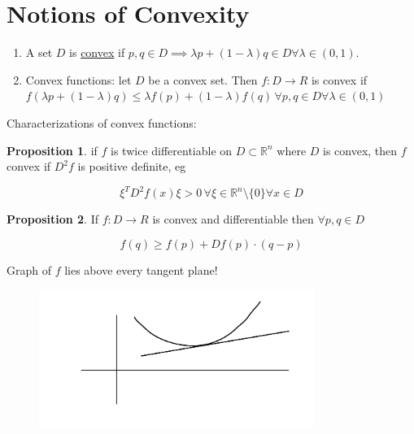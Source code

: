 \documentclass{article}
\theoremstyle{definition}
\newtheorem{proposition}{Proposition}
\begin{document}
\section{Notions of Convexity}

\begin{enumerate}[label=\arabic*)]
    \item A set \(D\) is \underline{convex} if \(p,q\in D \implies \lambda p + (1-\lambda)q \in D \forall \lambda \in (0,1)\).
    \item Convex functions: let \(D\) be a convex set. Then \(f: D \to R\) is convex if \(f(\lambda p + (1-\lambda)q) \leq \lambda f(p) + (1-\lambda)f(q)\, \forall p,q\in D \forall \lambda \in (0,1)\)  
\end{enumerate} 

Characterizations of convex functions:

\begin{proposition}
    if \(f\) is twice differentiable on \(D \subset \mathbb{R}^n\) where \(D\) is convex, then \(f\) convex if \(D^2 f\) is positive definite, eg

    \[
        \xi ^T D^2 f(x) \xi > 0 \, \forall \xi \in \mathbb{R}^n \setminus \{ 0 \}  \forall x\in D
    \]
\end{proposition}

\begin{proposition}
    If \(f: D \to R\) is convex and differentiable then \(\forall p,q\in D\) 
    
    \[
        f(q) \geq f(p) + D f(p) \cdot (q-p)
    \]

    Graph of \(f\) lies above every tangent plane!

    \begin{figure}[H]
        \centering
        \includegraphics[width=0.8\textwidth]{img/tangent}
        \caption{}
        \label{fig:tangent}
    \end{figure}
\end{proposition}
\end{document}
